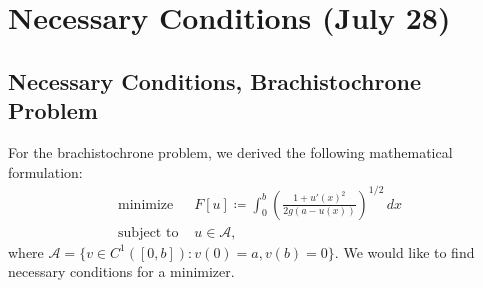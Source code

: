 \documentclass[11pt]{book}
\begin{document}
\newpage

\section{Necessary Conditions (July 28)}

\subsection{Necessary Conditions, Brachistochrone Problem}

For the brachistochrone problem, we derived the following mathematical formulation:
\begin{align*}
\text{minimize } & F[u] \coloneqq \int_0^b \left( \frac{1 + u'(x)^2}{2g(a-u(x))} \right)^{1/2} \, dx \\
\text{subject to } &u \in \mathcal{A},
\end{align*}
where $\mathcal{A} = \{ v \in C^1([0,b]) : v(0) = a, v(b) = 0 \}$. We would like to find necessary conditions for a minimizer.
\end{document}
